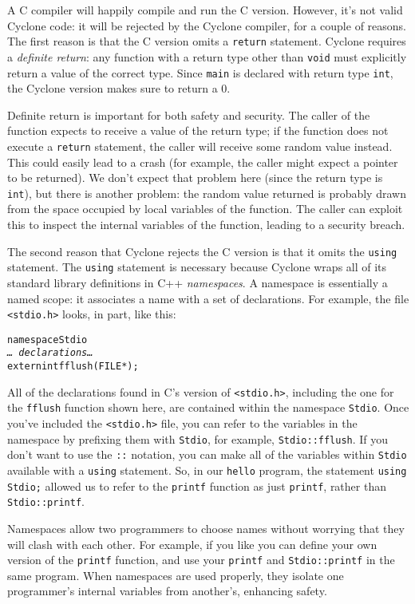 A C compiler will happily compile and run the C version.  However,
it's not valid Cyclone code: it will be rejected by the Cyclone
compiler, for a couple of reasons.  The first reason is that the C
version omits a \texttt{return} statement.  Cyclone requires a
\emph{definite return}: any function with a return type other than
\texttt{void} must explicitly return a value of the correct type.
Since \texttt{main} is declared with return type \texttt{int}, the
Cyclone version makes sure to return a 0.

Definite return is important for both safety and security.  The caller
of the function expects to receive a value of the return type; if the
function does not execute a \texttt{return} statement, the caller will
receive some random value instead.  This could easily lead to a crash
(for example, the caller might expect a pointer to be returned).  We
don't expect that problem here (since the return type is
\texttt{int}), but there is another problem: the random value returned
is probably drawn from the space occupied by local variables of the
function.  The caller can exploit this to inspect the internal
variables of the function, leading to a security breach.

The second reason that Cyclone rejects the C version is that it omits
the \texttt{using} statement.  The \texttt{using} statement is
necessary because Cyclone wraps all of its standard library
definitions in C++ \emph{namespaces}.  A namespace is essentially a
named scope: it associates a name with a set of declarations.  For
example, the file \texttt{<stdio.h>} looks, in part, like this:
\begin{alltt}
    namespace Stdio \lb
      {\it \ldots\ declarations \ldots}
      extern int fflush(FILE *);
    \rb
\end{alltt}
All of the declarations found in C's version of \texttt{<stdio.h>},
including the one for the \texttt{fflush} function shown here, are
contained within the namespace \texttt{Stdio}.  Once you've included
the \texttt{<stdio.h>} file, you can refer to the variables in the
namespace by prefixing them with \texttt{Stdio}, for example,
\texttt{Stdio::fflush}.  If you don't want to use the \texttt{::}
notation, you can make all of the variables within \texttt{Stdio}
available with a \texttt{using} statement.  So, in our \texttt{hello}
program, the statement \texttt{using Stdio;} allowed us to refer to
the \texttt{printf} function as just \texttt{printf}, rather than
\texttt{Stdio::printf}.

Namespaces allow two programmers to choose names without worrying that
they will clash with each other.  For example, if you like you can
define your own version of the \texttt{printf} function, and use your
\texttt{printf} and \texttt{Stdio::printf} in the same program.  When
namespaces are used properly, they isolate one programmer's internal
variables from another's, enhancing safety.

